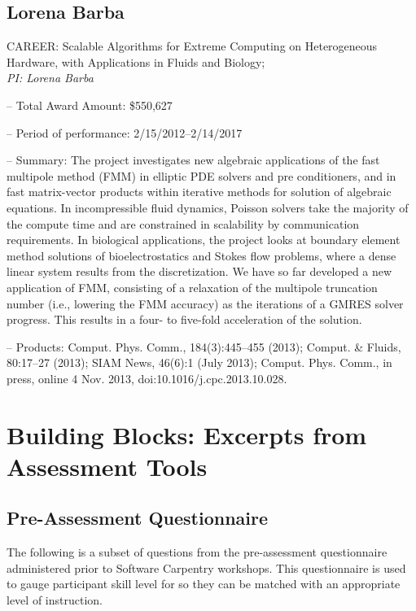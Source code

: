 \documentclass{proposalnsf}
\begin{document}
\subsection{Lorena Barba}


CAREER:  Scalable Algorithms for Extreme Computing on Heterogeneous  Hardware, with Applications in Fluids and Biology;\\  {\it PI: Lorena Barba}
\begin{compactitem}
\item[--] Total Award Amount: \$550,627
\item[--] Period of performance: 2/15/2012--2/14/2017
\item[--] Summary: The project investigates new algebraic applications of the fast multipole method (FMM) in elliptic PDE solvers and pre conditioners, and in fast matrix-vector products within iterative methods for solution of algebraic equations. In incompressible fluid dynamics, Poisson solvers take the majority of the compute time and are constrained in scalability by communication requirements. In biological applications, the project looks at boundary element method solutions of bioelectrostatics and Stokes flow problems, where a dense linear system results from the discretization. We have so far developed a new application of FMM, consisting of a relaxation of the multipole truncation number (i.e., lowering the FMM accuracy) as the iterations of a GMRES solver progress. This results in a four- to five-fold acceleration of the solution.
\item[--] Products: Comput. Phys. Comm., 184(3):445--455 (2013); Comput. \& Fluids, 80:17--27 (2013); SIAM News, 46(6):1 (July 2013); Comput. Phys. Comm., in press, online 4 Nov. 2013, doi:10.1016/j.cpc.2013.10.028.
\end{compactitem}

\section{Building Blocks: Excerpts from Assessment Tools}
\subsection{Pre-Assessment Questionnaire}
\label{sec:questionnaire}
The following is a subset of questions from the pre-assessment
questionnaire administered prior to Software Carpentry workshops. 
This questionnaire is used  to gauge participant skill level for so they can be
matched with an appropriate level of instruction.
\end{document}
